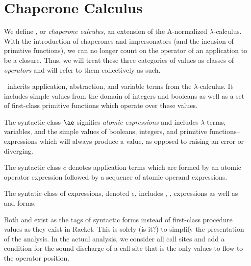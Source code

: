 \documentclass{sigplanconf}
\begin{document}

\section{Chaperone Calculus}

We define \chapcalc, or \emph{chaperone calculus}, an extension of the A-normalized $\lambda$-calculus.
With the introduction of chaperones and impersonators (and the incusion of primitive functions), we can no longer count on the operator of an application to be a closure.
Thus, we will treat these three categories of values as classes of \emph{operators} and will refer to them collectively as such.

\chapcalc\ inherits application, abstraction, and variable terms from the $\lambda$-calculus.
It includes simple values from the domain of integers and booleans as well as a set of first-class primitive functions which operate over these values.

The syntactic class $\ae$ signifies \emph{atomic expressions} and includes $\lambda$-terms, variables, and the simple values of booleans, integers, and primitive functions--expressions which will always produce a value, as opposed to raising an error or diverging.

The syntactic class $c$ denotes application terms which are formed by an atomic operator expression followed by a sequence of atomic operand expressions.

The syntatic class of expressions, denoted $e$, includes , ,  expressions as well as  and  forms.

Both  and  exist as the tags of syntactic forms instead of first-class procedure values as they exist in Racket.
This is solely (is it?) to simplify the presentation of the analysis.
In the actual analysis, we consider all call sites and add a condition for the sound discharge of a call site that  is the only values to flow to the operator position.
\end{document}
